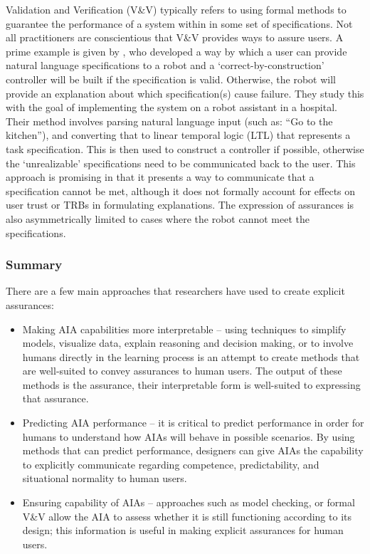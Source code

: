    Validation and Verification (V\&V) typically refers to using formal methods to guarantee the performance of a system within in some set of specifications. Not all practitioners are conscientious that V\&V provides ways to assure users. A prime example is given by \citet{Raman2013-mz}, who developed a way by which a user can provide natural language specifications to a robot and a `correct-by-construction' controller will be built if the specification is valid. Otherwise, the robot will provide an explanation about which specification(s) cause failure. They study this with the goal of implementing the system on a robot assistant in a hospital. Their method involves parsing natural language input (such as: ``Go to the kitchen''), and converting that to linear temporal logic (LTL) that represents a task specification. This is then used to construct a controller if possible, otherwise the `unrealizable' specifications need to be communicated back to the user. This approach is promising in that it presents a way to communicate that a specification cannot be met, although it does not formally account for effects on user trust or TRBs in formulating explanations. The expression of assurances is also asymmetrically limited to cases where the robot cannot meet the specifications. 

\subsubsection{Summary}
    There are a few main approaches that researchers have used to create explicit assurances:

    \begin{itemize}
        \item Making AIA capabilities more interpretable -- using techniques to simplify models, visualize data, explain reasoning and decision making, or to involve humans directly in the learning process is an attempt to create methods that are well-suited to convey assurances to human users. The output of these methods is the assurance, their interpretable form is well-suited to expressing that assurance.
        \item Predicting AIA performance -- it is critical to predict performance in order for humans to understand how AIAs will behave in possible scenarios. By using methods that can predict performance, designers can give AIAs the capability to explicitly communicate regarding competence, predictability, and situational normality to human users.
        \item Ensuring capability of AIAs -- approaches such as model checking, or formal V\&V allow the AIA to assess whether it is still functioning according to its design; this information is useful in making explicit assurances for human users.
    \end{itemize}

